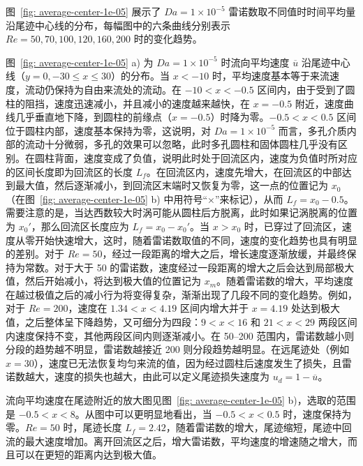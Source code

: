 
图~\ref{fig: average-center-1e-05} 展示了 $Da=1\times 10^{-5}$ 雷诺数取不同值时时间平均量沿尾迹中心线的分布，每幅图中的六条曲线分别表示 $Re=50,70,100,120,160,200$ 时的变化趋势。

图~\ref{fig: average-center-1e-05} a) 为 $Da=1\times 10^{-5}$ 时流向平均速度 $\overline{u}$ 沿尾迹中心线（$y=0, -30\leq x\leq 30$）的分布。当 $x<-10$ 时，平均速度基本等于来流速度，流动仍保持为自由来流处的流动。在 $-10<x<-0.5$ 区间内，由于受到了圆柱的阻挡，速度迅速减小，并且减小的速度越来越快，在 $x=-0.5$ 附近，速度曲线几乎垂直地下降，到圆柱的前缘点（$x=-0.5$）时降为零。$-0.5<x<0.5$ 区间位于圆柱内部，速度基本保持为零，这说明，对 $Da=1\times 10^{-5}$ 而言，多孔介质内部的流动十分微弱，多孔的效果可以忽略，此时多孔圆柱和固体圆柱几乎没有区别。在圆柱背面，速度变成了负值，说明此时处于回流区内，速度为负值时所对应的区间长度即为回流区的长度 $L_f$。在回流区内，速度先增大，在回流区的中部达到最大值，然后逐渐减小，到回流区末端时又恢复为零，这一点的位置记为 $x_0$（在图~\ref{fig: average-center-1e-05} b) 中用符号“$\times$”来标记），从而 $L_f=x_0-0.5$。需要注意的是，当达西数较大时涡可能从圆柱后方脱离，此时如果记涡脱离的位置为 $x_0'$，那么回流区长度应为 $L_f=x_0-x_0'$。当 $x>x_0$ 时，已穿过了回流区，速度从零开始快速增大，这时，随着雷诺数取值的不同，速度的变化趋势也具有明显的差别。对于 $Re=50$，经过一段距离的增大之后，增长速度逐渐放缓，并最终保持为常数。对于大于 50 的雷诺数，速度经过一段距离的增大之后会达到局部极大值，然后开始减小，将达到极大值的位置记为 $x_m$。随着雷诺数的增大，平均速度在越过极值之后的减小行为将变得复杂，渐渐出现了几段不同的变化趋势。例如，对于 $Re=200$，速度在 $1.34<x<4.19$ 区间内增大并于 $x=4.19$ 处达到极大值，之后整体呈下降趋势，又可细分为四段：$9<x<16$ 和 $21<x<29$ 两段区间内速度保持不变，其他两段区间内则逐渐减小。在 50--200 范围内，雷诺数越小则分段的趋势越不明显，雷诺数越接近 200 则分段趋势越明显。在远尾迹处（例如 $x=30$），速度已无法恢复均匀来流的值，因为经过圆柱后速度发生了损失，且雷诺数越大，速度的损失也越大，由此可以定义尾迹损失速度为 $u_d=1-\overline{u}$。

流向平均速度在尾迹附近的放大图见图~\ref{fig: average-center-1e-05} b)，选取的范围是 $-0.5<x<8$。从图中可以更明显地看出，当 $-0.5<x<0.5$ 时，速度保持为零。$Re=50$ 时，尾迹长度 $L_f=2.42$，随着雷诺数的增大，尾迹缩短，尾迹中回流的最大速度增加。离开回流区之后，增大雷诺数，平均速度的增速随之增大，而且可以在更短的距离内达到极大值。

